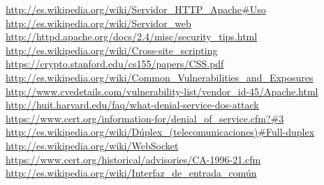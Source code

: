 \documentclass[a4paper, 10pt]{article} %
\begin{document}
\begin{thebibliography}{99}
 \url{http://es.wikipedia.org/wiki/Servidor_HTTP_Apache#Uso}
 \url{http://es.wikipedia.org/wiki/Servidor_web}
 \url{http://httpd.apache.org/docs/2.4/misc/security_tips.html}
 \url{http://es.wikipedia.org/wiki/Cross-site_scripting}
 \url{https://crypto.stanford.edu/cs155/papers/CSS.pdf}
 \url{http://es.wikipedia.org/wiki/Common_Vulnerabilities_and_Exposures}
 \url{http://www.cvedetails.com/vulnerability-list/vendor_id-45/Apache.html}
 \url{http://huit.harvard.edu/faq/what-denial-service-dos-attack}
 \url{https://www.cert.org/information-for/denial_of_service.cfm?#3}
 \url{http://es.wikipedia.org/wiki/Dúplex_(telecomunicaciones)#Full-duplex}
 \url{http://es.wikipedia.org/wiki/WebSocket}
 \url{https://www.cert.org/historical/advisories/CA-1996-21.cfm}
 \url{http://es.wikipedia.org/wiki/Interfaz_de_entrada_común}
\end{thebibliography}
\end{document}
